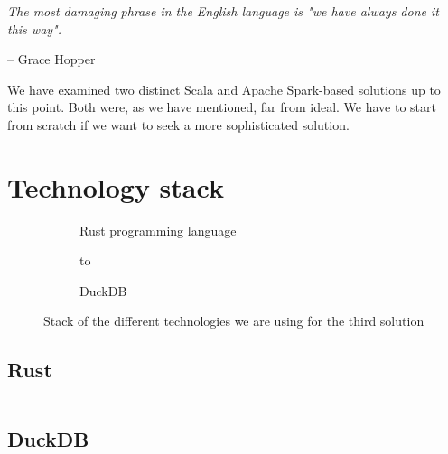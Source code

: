 \epigraph{\textit{The most damaging phrase in the English language is "we have always done it this way".}}{-- \textup{Grace Hopper}}

We have examined two distinct Scala and Apache Spark-based solutions up to this point. Both were, as we have mentioned, far from ideal. We have to start from scratch if we want to seek a more sophisticated solution.

\section{Technology stack}

\begin{figure}[ht]
    \newsavebox\mybox

    \begin{subfigure}{.45\textwidth}
        \centering
        \usebox{\mybox}
        \caption{Rust programming language}
    \end{subfigure}%
    \hspace*{0.5em}
    \begin{subfigure}{.45\textwidth}
        \centering
        \vbox to \ht{}
        \caption{DuckDB}
    \end{subfigure}%
    \caption{Stack of the different technologies we are using for the third solution}
\end{figure}

\subsection{Rust}

\begin{code}
    \inputminted{rust}{code/listings/9-1_helloWorld.rs}
\end{code}

\subsection{DuckDB}